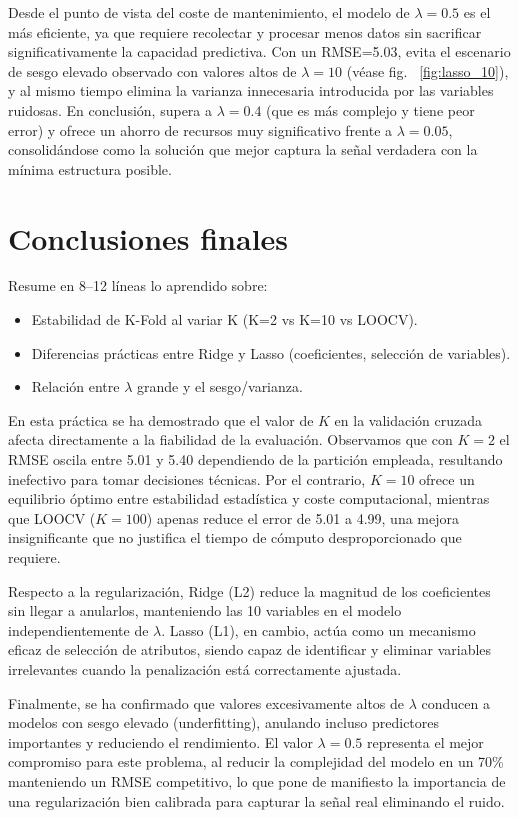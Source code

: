 Desde el punto de vista del coste de mantenimiento, el modelo de $\lambda=0.5$ es el más eficiente, ya que requiere recolectar y procesar menos datos sin sacrificar significativamente la capacidad predictiva. Con un RMSE=5.03, evita el escenario de sesgo elevado observado con valores altos de $\lambda=10$ (véase fig. ~\ref{fig:lasso_10}), y al mismo tiempo elimina la varianza innecesaria introducida por las variables ruidosas. En conclusión, supera a $\lambda=0.4$ (que es más complejo y tiene peor error) y ofrece un ahorro de recursos muy significativo frente a $\lambda=0.05$, consolidándose como la solución que mejor captura la señal verdadera con la mínima estructura posible.

\section{Conclusiones finales}
Resume en 8--12 líneas lo aprendido sobre:
\begin{itemize}
    \item Estabilidad de K-Fold al variar K (K=2 vs K=10 vs LOOCV).
    \item Diferencias prácticas entre Ridge y Lasso (coeficientes, selección de variables).
    \item Relación entre $\lambda$ grande y el sesgo/varianza.
\end{itemize}

En esta práctica se ha demostrado que el valor de $K$ en la validación cruzada afecta directamente a la fiabilidad de la evaluación. Observamos que con $K=2$ el RMSE oscila entre 5.01 y 5.40 dependiendo de la partición empleada, resultando inefectivo para tomar decisiones técnicas. Por el contrario, $K=10$ ofrece un equilibrio óptimo entre estabilidad estadística y coste computacional, mientras que LOOCV ($K=100$) apenas reduce el error de 5.01 a 4.99, una mejora insignificante que no justifica el tiempo de cómputo desproporcionado que requiere.

Respecto a la regularización, Ridge (L2) reduce la magnitud de los coeficientes sin llegar a anularlos, manteniendo las 10 variables en el modelo independientemente de $\lambda$. Lasso (L1), en cambio, actúa como un mecanismo eficaz de selección de atributos, siendo capaz de identificar y eliminar variables irrelevantes cuando la penalización está correctamente ajustada.

Finalmente, se ha confirmado que valores excesivamente altos de $\lambda$ conducen a modelos con sesgo elevado (underfitting), anulando incluso predictores importantes y reduciendo el rendimiento. El valor $\lambda=0.5$ representa el mejor compromiso para este problema, al reducir la complejidad del modelo en un 70\% manteniendo un RMSE competitivo, lo que pone de manifiesto la importancia de una regularización bien calibrada para capturar la señal real eliminando el ruido.
